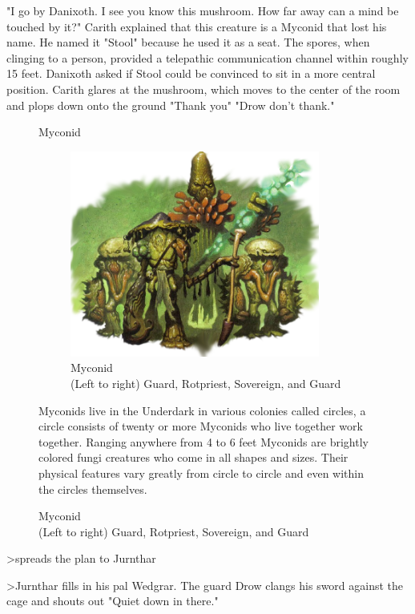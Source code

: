 \documentclass[letterpaper,10pt,twoside,twocolumn,openany]{book}
\begin{document}
"I go by Danixoth. I see you know this mushroom. How far away can a mind be touched by it?" Carith explained that this creature is a Myconid that lost his name. He named it "Stool" because he used it as a seat. The spores, when clinging to a person, provided a telepathic communication channel within roughly 15 feet. Danixoth asked if Stool could be convinced to sit in a more central position. Carith glares at the mushroom, which moves to the center of the room and plops down onto the ground "Thank you" "Drow don't thank."
\begin{figure}[h]
	\begin{paperbox}{Myconid}
		\begin{figure}[H]
			\centering
			\includegraphics[width=0.9\textwidth]{img/dist/myconid.png}
			\caption{Myconid\\{\tiny(Left to right) Guard, Rotpriest, Sovereign, and Guard}\label{fig:myconid}}
		\end{figure}
		Myconids live in the Underdark in various colonies called circles, a circle consists of twenty or more Myconids who live together work together. Ranging anywhere from 4 to 6 feet Myconids are brightly colored fungi creatures who come in all shapes and sizes. Their physical features vary greatly from circle to circle and even within the circles themselves.
	\end{paperbox}
\end{figure}

>spreads the plan to Jurnthar

>Jurnthar fills in his pal Wedgrar. The guard Drow clangs his sword against the cage and shouts out "Quiet down in there."
\end{document}
